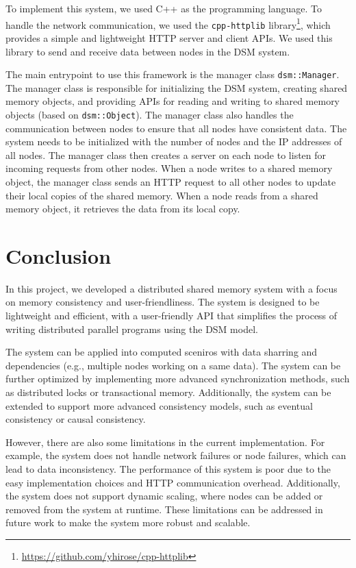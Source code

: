 \documentclass[journal]{IEEEtran}
\begin{document}
To implement this system, we used C++ as the programming language. To handle the network communication, we used the \texttt{cpp-httplib} library\footnote{\url{https://github.com/yhirose/cpp-httplib}}, which provides a simple and lightweight HTTP server and client APIs. We used this library to send and receive data between nodes in the DSM system. 

The main entrypoint to use this framework is the manager class \texttt{dsm::Manager}. The manager class is responsible for initializing the DSM system, creating shared memory objects, and providing APIs for reading and writing to shared memory objects (based on \texttt{dsm::Object}). The manager class also handles the communication between nodes to ensure that all nodes have consistent data. 
The system needs to be initialized with the number of nodes and the IP addresses of all nodes. The manager class then creates a server on each node to listen for incoming requests from other nodes. When a node writes to a shared memory object, the manager class sends an HTTP request to all other nodes to update their local copies of the shared memory. When a node reads from a shared memory object, it retrieves the data from its local copy.

\section{Conclusion}

In this project, we developed a distributed shared memory system with a focus on memory consistency and user-friendliness. The system is designed to be lightweight and efficient, with a user-friendly API that simplifies the process of writing distributed parallel programs using the DSM model. 

The system can be applied into computed sceniros with data sharring and dependencies (e.g., multiple nodes working on a same data). The system can be further optimized by implementing more advanced synchronization methods, such as distributed locks or transactional memory. Additionally, the system can be extended to support more advanced consistency models, such as eventual consistency or causal consistency.

However, there are also some limitations in the current implementation. For example, the system does not handle network failures or node failures, which can lead to data inconsistency. The performance of this system is poor due to the easy implementation choices and HTTP communication overhead. Additionally, the system does not support dynamic scaling, where nodes can be added or removed from the system at runtime. These limitations can be addressed in future work to make the system more robust and scalable.




\end{document}
